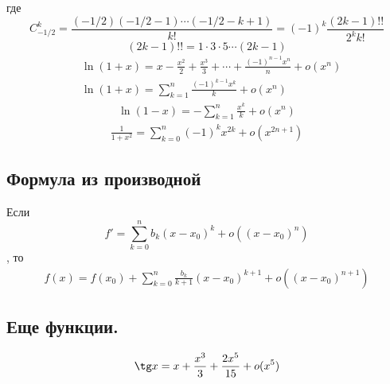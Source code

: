 \documentclass[a4paper,14pt]{article}
\begin{document}
    где
    \[C_{-1/2}^k=\frac{(-1/2)(-1/2-1)\cdots(-1/2-k+1)}{k!}=(-1)^k \frac{(2k-1)!!}{2^kk!}\]
    \[(2k-1)!!=1\cdot 3\cdot 5\cdots(2k-1)\]
    \begin{align}
        &\ln(1+x)=x-\frac{x^2}{2}+\frac{x^3}{3}+\cdots+\frac{(-1)^{n-1}x^n}{n}+o(x^n) \nonumber\\
        &\ln(1+x)=\sum_{k=1}^{n}\frac{(-1)^{k-1}x^k}{k}+o(x^n) 
    \end{align}
    \begin{align}
        \ln(1-x)=-\sum_{k=1}^{n} \frac{x^k}{k}+o(x^n)
    \end{align}
    \begin{align}
        \frac{1}{1+x^2}=\sum_{k=0}^{n} (-1)^kx^{2k}+o(x^{2n+1})
    \end{align}
    \subsection{Формула из производной}
    Если 
    \[f'=\sum_{k=0}^{n} b_k(x-x_0)^k+o\left((x-x_0)^n\right)\], то 
    \begin{align}
        f(x)=f(x_0)+\sum_{k=0}^{n} \frac{b_k}{k+1}(x-x_0)^{k+1}+o\left((x-x_0)^{n+1}\right)
    \end{align}
    \subsection{Еще функции.}
    \begin{align}
        \tg x = x+\frac{x^3}{3}+\frac{2x^5}{15}+o(x^5)
    \end{align}
\end{document}
